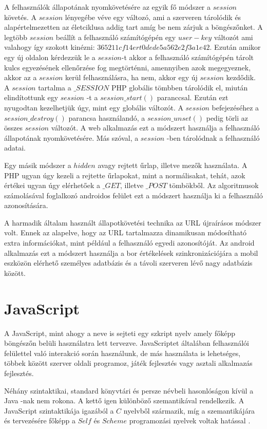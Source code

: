 \documentclass[12pt]{report}
\theoremstyle{definition}
\begin{document}
	A felhasználók állapotának nyomkövetésére az egyik fő módszer a $session$ követés. A $session$ lényegébe véve egy változó, ami a szerveren tárolódik és alapértelmezetten az életciklusa addig tart amíg be nem zárjuk a böngészőnket. A legtöbb $session$ beállít a felhasználó számítógépén egy $user-key$ változót ami valahogy így szokott kinézni: $365211cf14ert0dede5a562e2f3a1e42$. Ezután amikor egy új oldalon kérdezzük le a $session$-t akkor a felhasználó számítógépén tárolt kulcs egyezésének ellenőrzése fog megtörténni, amennyiben azok megegyeznek, akkor az a $session$ kerül felhasználásra, ha nem, akkor egy új $session$ kezdődik.
	A $session$ tartalma a $\_SESSION$ PHP globális tömbben tárolódik el, miután elindítottunk egy $session$ -t a $session\_start\left(\right)$ paranccsal. Ezután ezt nyugodtan kezelhetjük úgy, mint egy globális változót. A $session$ befejezéséhez a $session\_destroy\left(\right)$ parancsa használandó, a $session\_unset\left(\right)$ pedig törli az összes $session$ változót. A web alkalmazás ezt a módszert használja a felhasználó állapotának nyomkövetésére. Más szóval, a $session$ -ben tárolódnak a felhasználó adatai.
	
	Egy másik módszer a $hidden$ avagy rejtett űrlap, illetve mezők használata. A PHP ugyan úgy kezeli a rejtette űrlapokat, mint a normálisakat, tehát, azok értékei ugyan úgy elérhetőek a $\_GET$, illetve $\_POST$ tömbökből. Az algoritmusok számolásával foglalkozó androidos felület ezt a módszert használja ki a felhasználó azonosítására.
	
	A harmadik általam használt állapotkövetési technika az URL újraírásos módszer volt. Ennek az alapelve, hogy az URL tartalmazza dinamikusan módosítható extra információkat, mint például a felhasználó egyedi azonosítóját. Az android alkalmazás ezt a módszert használja a bor értékelések szinkronizációjára a mobil eszközön elérhető személyes adatbázis és a távoli szerveren lévő nagy adatbázis között.
	
	
	\section{JavaScript}
	A JavaScript, mint ahogy a neve is sejteti egy szkript nyelv amely főképp böngészőn belüli használatra lett tervezve. JavaScriptet általában felhasználói felülettel való interakció során használunk, de más használata is lehetséges, többek között szerver oldali programoz, játék fejlesztés vagy asztali alkalmazás fejlesztés.
	
	Néhány szintaktikai, standard könyvtári és persze névbeli hasonlóságon kívül a Java -nak nem rokona. A kettő igen különböző szemantikával rendelkezik. A JavaScript szintaktikája igazából a $C$ nyelvből származik, míg a szemantikájára és tervezésére főképp a $Self$ és $Scheme$ programozási nyelvek voltak hatással \cite{ECMAScript Language Overview}.
	
\end{document}
